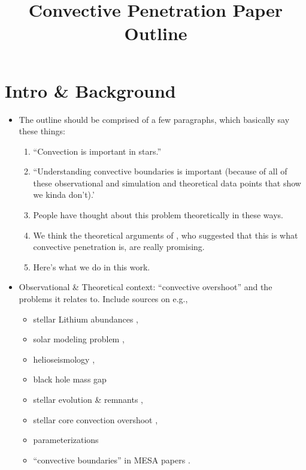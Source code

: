 \documentclass[12pt, fullpage]{article}
\begin{document}
\title{Convective Penetration Paper Outline}
\maketitle

\section{Intro \& Background}
\begin{itemize}
\item The outline should be comprised of a few paragraphs, which basically say these things:
\begin{enumerate}
\item ``Convection is important in stars.''
\item ``Understanding convective boundaries is important (because of all of these observational and simulation and theoretical data points that show we kinda don't).'
\item People have thought about this problem theoretically in these ways.
\item We think the theoretical arguments of \citet{zahn1991}, who suggested that this is what convective penetration is, are really promising.
\item Here's what we do in this work.
\end{enumerate}
\item Observational \& Theoretical context: ``convective overshoot'' and the problems it relates to.
Include sources on e.g., 
\begin{itemize}
\item stellar Lithium abundances \citep[fig 4 of][]{pinsonneault_1997, dumont_etal_2021}, 
\item solar modeling problem \citep{basu_antia_2004, bahcall_etal_2005, zhang_li_2012, vinyoles_etal_2017, asplund_etal_2021},
\item helioseismology \citep[][]{christensen-dalsgaard_etal_2011},
\item black hole mass gap \citep{farmer_etal_2019}
\item stellar evolution \& remnants \citep{higgins_vink_2020}, 
\item stellar core convection overshoot \citep{claret_torres_2018, jermyn_etal_2018, viani_basu_2020, martinet_etal_2021}, 
\item parameterizations \citep{shaviv_salpeter_1973, maeder1975, herwig2000}
\item``convective boundaries'' in MESA papers \citep{paxton_etal_2011, paxton_etal_2013, paxton_etal_2018, paxton_etal_2019}. 

\end{itemize}
\end{itemize}
\end{document}
